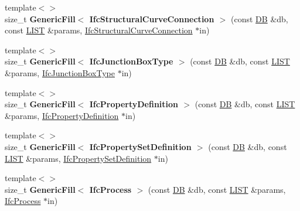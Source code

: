 \begin{DoxyCompactItemize}
\item 
\hypertarget{namespace_assimp_1_1_s_t_e_p_aec62d019c400611695cb20918f0f99a1}{{\footnotesize template$<$$>$ }\\size\+\_\+t {\bfseries Generic\+Fill$<$ Ifc\+Structural\+Curve\+Connection $>$} (const \hyperlink{class_assimp_1_1_s_t_e_p_1_1_d_b}{D\+B} \&db, const \hyperlink{class_assimp_1_1_s_t_e_p_1_1_e_x_p_r_e_s_s_1_1_l_i_s_t}{L\+I\+S\+T} \&params, \hyperlink{struct_assimp_1_1_i_f_c_1_1_ifc_structural_curve_connection}{Ifc\+Structural\+Curve\+Connection} $\ast$in)}\label{namespace_assimp_1_1_s_t_e_p_aec62d019c400611695cb20918f0f99a1}

\item 
\hypertarget{namespace_assimp_1_1_s_t_e_p_a5952d90710a6bbe17afa5b2fe097da65}{{\footnotesize template$<$$>$ }\\size\+\_\+t {\bfseries Generic\+Fill$<$ Ifc\+Junction\+Box\+Type $>$} (const \hyperlink{class_assimp_1_1_s_t_e_p_1_1_d_b}{D\+B} \&db, const \hyperlink{class_assimp_1_1_s_t_e_p_1_1_e_x_p_r_e_s_s_1_1_l_i_s_t}{L\+I\+S\+T} \&params, \hyperlink{struct_assimp_1_1_i_f_c_1_1_ifc_junction_box_type}{Ifc\+Junction\+Box\+Type} $\ast$in)}\label{namespace_assimp_1_1_s_t_e_p_a5952d90710a6bbe17afa5b2fe097da65}

\item 
\hypertarget{namespace_assimp_1_1_s_t_e_p_ac71625989445cd1a662aecb51cc59722}{{\footnotesize template$<$$>$ }\\size\+\_\+t {\bfseries Generic\+Fill$<$ Ifc\+Property\+Definition $>$} (const \hyperlink{class_assimp_1_1_s_t_e_p_1_1_d_b}{D\+B} \&db, const \hyperlink{class_assimp_1_1_s_t_e_p_1_1_e_x_p_r_e_s_s_1_1_l_i_s_t}{L\+I\+S\+T} \&params, \hyperlink{struct_assimp_1_1_i_f_c_1_1_ifc_property_definition}{Ifc\+Property\+Definition} $\ast$in)}\label{namespace_assimp_1_1_s_t_e_p_ac71625989445cd1a662aecb51cc59722}

\item 
\hypertarget{namespace_assimp_1_1_s_t_e_p_ae94d68d008127ace30530f4da2f15805}{{\footnotesize template$<$$>$ }\\size\+\_\+t {\bfseries Generic\+Fill$<$ Ifc\+Property\+Set\+Definition $>$} (const \hyperlink{class_assimp_1_1_s_t_e_p_1_1_d_b}{D\+B} \&db, const \hyperlink{class_assimp_1_1_s_t_e_p_1_1_e_x_p_r_e_s_s_1_1_l_i_s_t}{L\+I\+S\+T} \&params, \hyperlink{struct_assimp_1_1_i_f_c_1_1_ifc_property_set_definition}{Ifc\+Property\+Set\+Definition} $\ast$in)}\label{namespace_assimp_1_1_s_t_e_p_ae94d68d008127ace30530f4da2f15805}

\item 
\hypertarget{namespace_assimp_1_1_s_t_e_p_a3aa2283d4fac7b6f3a02e576fad2ecfd}{{\footnotesize template$<$$>$ }\\size\+\_\+t {\bfseries Generic\+Fill$<$ Ifc\+Process $>$} (const \hyperlink{class_assimp_1_1_s_t_e_p_1_1_d_b}{D\+B} \&db, const \hyperlink{class_assimp_1_1_s_t_e_p_1_1_e_x_p_r_e_s_s_1_1_l_i_s_t}{L\+I\+S\+T} \&params, \hyperlink{struct_assimp_1_1_i_f_c_1_1_ifc_process}{Ifc\+Process} $\ast$in)}\label{namespace_assimp_1_1_s_t_e_p_a3aa2283d4fac7b6f3a02e576fad2ecfd}


\end{DoxyCompactItemize}
